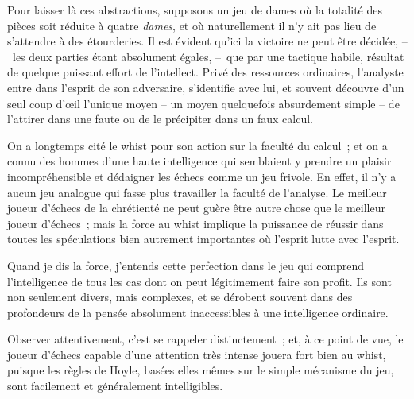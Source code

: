 \documentclass[french,twoside]{book} %
\begin{document}
Pour laisser là ces abstractions, supposons un jeu de dames où la totalité des pièces soit réduite à quatre \emph{dames}, et où naturellement il n’y ait pas lieu de s’attendre à des étourderies. Il est évident qu’ici la victoire ne peut être décidée, – les deux parties étant absolument égales, – que par une tactique habile, résultat de quelque puissant effort de l’intellect. Privé des ressources ordinaires, l’analyste entre dans l’esprit de son adversaire, s’identifie avec lui, et souvent découvre d’un seul coup d’œil l’unique moyen – un moyen quelquefois absurdement simple – de l’attirer dans une faute ou de le précipiter dans un faux calcul.\par
On a longtemps cité le whist pour son action sur la faculté du calcul ; et on a connu des hommes d’une haute intelligence qui semblaient y prendre un plaisir incompréhensible et dédaigner les échecs comme un jeu frivole. En effet, il n’y a aucun jeu analogue qui fasse plus travailler la faculté de l’analyse. Le meilleur joueur d’échecs de la chrétienté ne peut guère être autre chose que le meilleur joueur d’échecs ; mais la force au whist implique la puissance de réussir dans toutes les spéculations bien autrement importantes où l’esprit lutte avec l’esprit.\par
Quand je dis la force, j’entends cette perfection dans le jeu qui comprend l’intelligence de tous les cas dont on peut légitimement faire son profit. Ils sont non seulement divers, mais complexes, et se dérobent souvent dans des profondeurs de la pensée absolument inaccessibles à une intelligence ordinaire.\par
Observer attentivement, c’est se rappeler distinctement ; et, à ce point de vue, le joueur d’échecs capable d’une attention très intense jouera fort bien au whist, puisque les règles de Hoyle, basées elles mêmes sur le simple mécanisme du jeu, sont facilement et généralement intelligibles.\par
\end{document}
